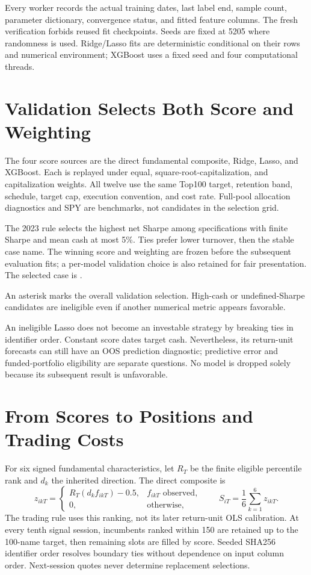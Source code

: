 \documentclass[11pt]{article}
\newcommand{\nbtable}[3]{\begin{table}[H]\centering\caption{#2}\label{tab:#1}\small\sbox{\tablebox}{}\ifdim\wd\tablebox>\linewidth\resizebox{\linewidth}{!}{\usebox{\tablebox}}\else\usebox{\tablebox}\fi\par\vspace{3pt}\begin{minipage}{\textwidth}\footnotesize #3\end{minipage}\end{table}}
\begin{document}
Every worker records the actual training dates, last label end, sample count, parameter dictionary, convergence status, and fitted feature columns. The fresh verification forbids reused fit checkpoints. Seeds are fixed at 5205 where randomness is used. Ridge/Lasso fits are deterministic conditional on their rows and numerical environment; XGBoost uses a fixed seed and four computational threads.
\clearpage

\section{Validation Selects Both Score and Weighting}
The four score sources are the direct fundamental composite, Ridge, Lasso, and XGBoost. Each is replayed under equal, square-root-capitalization, and capitalization weights. All twelve use the same Top100 target, retention band, schedule, target cap, execution convention, and cost rate. Full-pool allocation diagnostics and SPY are benchmarks, not candidates in the selection grid.

The 2023 rule selects the highest net Sharpe among specifications with finite Sharpe and mean cash at most 5\%. Ties prefer lower turnover, then the stable case name. The winning score and weighting are frozen before the subsequent evaluation fits; a per-model validation choice is also retained for fair presentation. The selected case is \textbf{\SelectedName{}}.
\nbtable{nb_validation}{All twelve 2023 score--weighting candidates.}{An asterisk marks the overall validation selection. High-cash or undefined-Sharpe candidates are ineligible even if another numerical metric appears favorable.}

An ineligible Lasso does not become an investable strategy by breaking ties in identifier order. Constant score dates target cash. Nevertheless, its return-unit forecasts can still have an OOS prediction diagnostic; predictive error and funded-portfolio eligibility are separate questions. No model is dropped solely because its subsequent result is unfavorable.
\clearpage

\section{From Scores to Positions and Trading Costs}
For six signed fundamental characteristics, let $R_T$ be the finite eligible percentile rank and $d_k$ the inherited direction. The direct composite is
\[
z_{ikT}=\begin{cases}R_T(d_k f_{ikT})-0.5,&f_{ikT}\text{ observed},\\0,&\text{otherwise},\end{cases}
\qquad S_{iT}=\frac16\sum_{k=1}^{6}z_{ikT}.
\]
The trading rule uses this ranking, not its later return-unit OLS calibration. At every tenth signal session, incumbents ranked within 150 are retained up to the 100-name target, then remaining slots are filled by score. Seeded SHA256 identifier order resolves boundary ties without dependence on input column order. Next-session quotes never determine replacement selections.
\end{document}

